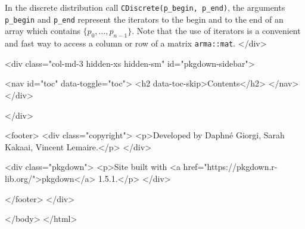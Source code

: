 In the discrete distribution call \texttt{CDiscrete(p\_begin,\ p\_end)}, the arguments \texttt{p\_begin} and \texttt{p\_end} represent the iterators to the begin and to the end of an array which contains \(\{p_0, \dots, p_{n-1}\}\). Note that the use of iterators is a convenient and fast way to access a column or row of a matrix \texttt{arma::mat}.
  </div>

  <div class="col-md-3 hidden-xs hidden-sm" id="pkgdown-sidebar">

        <nav id="toc" data-toggle="toc">
      <h2 data-toc-skip>Contents</h2>
    </nav>
      </div>

</div>



      <footer>
      <div class="copyright">
  <p>Developed by Daphné Giorgi, Sarah Kakaai, Vincent Lemaire.</p>
</div>

<div class="pkgdown">
  <p>Site built with <a href="https://pkgdown.r-lib.org/">pkgdown</a> 1.5.1.</p>
</div>

      </footer>
   </div>

  


  </body>
</html>

